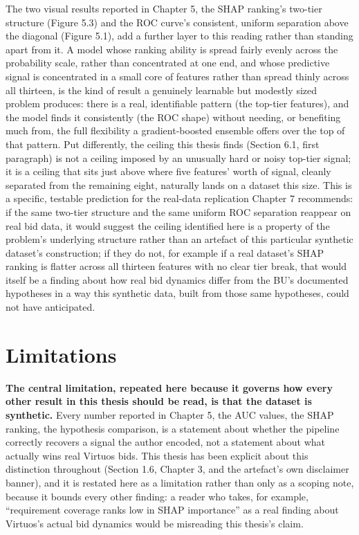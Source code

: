 \documentclass[12pt,oneside]{report}
\begin{document}
The two visual results reported in Chapter 5, the SHAP ranking's
two-tier structure (Figure 5.3) and the ROC curve's consistent, uniform
separation above the diagonal (Figure 5.1), add a further layer to this
reading rather than standing apart from it. A model whose ranking
ability is spread fairly evenly across the probability scale, rather
than concentrated at one end, and whose predictive signal is
concentrated in a small core of features rather than spread thinly
across all thirteen, is the kind of result a genuinely learnable but
modestly sized problem produces: there is a real, identifiable pattern
(the top-tier features), and the model finds it consistently (the ROC
shape) without needing, or benefiting much from, the full flexibility a
gradient-boosted ensemble offers over the top of that pattern. Put
differently, the ceiling this thesis finds (Section 6.1, first
paragraph) is not a ceiling imposed by an unusually hard or noisy
top-tier signal; it is a ceiling that sits just above where five
features' worth of signal, cleanly separated from the remaining eight,
naturally lands on a dataset this size. This is a specific, testable
prediction for the real-data replication Chapter 7 recommends: if the
same two-tier structure and the same uniform ROC separation reappear on
real bid data, it would suggest the ceiling identified here is a
property of the problem's underlying structure rather than an artefact
of this particular synthetic dataset's construction; if they do not, for
example if a real dataset's SHAP ranking is flatter across all thirteen
features with no clear tier break, that would itself be a finding about
how real bid dynamics differ from the BU's documented hypotheses in a
way this synthetic data, built from those same hypotheses, could not
have anticipated.

\hypertarget{limitations}{%
\section{Limitations}\label{limitations}}

\textbf{The central limitation, repeated here because it governs how
every other result in this thesis should be read, is that the dataset is
synthetic.} Every number reported in Chapter 5, the AUC values, the SHAP
ranking, the hypothesis comparison, is a statement about whether the
pipeline correctly recovers a signal the author encoded, not a statement
about what actually wins real Virtuos bids. This thesis has been
explicit about this distinction throughout (Section 1.6, Chapter 3, and
the artefact's own disclaimer banner), and it is restated here as a
limitation rather than only as a scoping note, because it bounds every
other finding: a reader who takes, for example, ``requirement coverage
ranks low in SHAP importance'' as a real finding about Virtuos's actual
bid dynamics would be misreading this thesis's claim.
\end{document}
